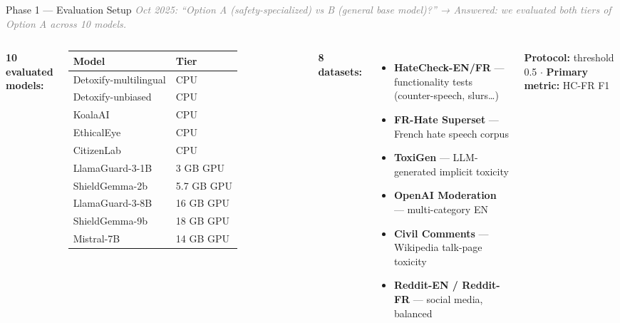 \documentclass[aspectratio=169, 12pt]{beamer}
\begin{document}
\begin{frame}[shrink=35]{Phase 1 — Evaluation Setup}
  \textit{\small\textcolor{gray}{Oct 2025: ``Option A (safety-specialized) vs B (general base model)?'' → Answered: we evaluated both tiers of Option A across 10 models.}}\\[4pt]
  \begin{columns}[T]
      \small\textbf{10 evaluated models:}\\[2pt]
      \begin{tabular}{ll}
        \toprule
        \textbf{Model} & \textbf{Tier} \\
        \midrule
        Detoxify-multilingual & CPU \\
        Detoxify-unbiased & CPU \\
        KoalaAI & CPU \\
        EthicalEye & CPU \\
        CitizenLab & CPU \\
        \midrule
        LlamaGuard-3-1B & 3 GB GPU \\
        ShieldGemma-2b & 5.7 GB GPU \\
        \midrule
        LlamaGuard-3-8B & 16 GB GPU \\
        ShieldGemma-9b & 18 GB GPU \\
        Mistral-7B & 14 GB GPU \\
        \bottomrule
      \end{tabular}

      \small\textbf{8 datasets:}
      \begin{itemize}
        \item \textbf{HateCheck-EN/FR} — functionality tests (counter-speech, slurs…)
        \item \textbf{FR-Hate Superset} — French hate speech corpus
        \item \textbf{ToxiGen} — LLM-generated implicit toxicity
        \item \textbf{OpenAI Moderation} — multi-category EN
        \item \textbf{Civil Comments} — Wikipedia talk-page toxicity
        \item \textbf{Reddit-EN / Reddit-FR} — social media, balanced
      \end{itemize}
      \vspace{3pt}
      \small\textbf{Protocol:} threshold 0.5 $\cdot$ \textbf{Primary metric:} HC-FR F1
  \end{columns}
\end{frame}
\end{document}

